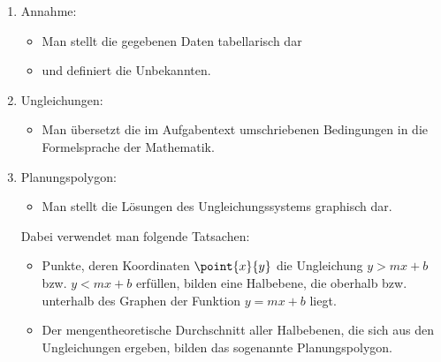 \documentclass[%
11pt,%
twoside,%
titlepage,%
german,%
headsepline%
]{scrartcl}
\begin{document}
\begin{enumerate}
  \item Annahme:
  \begin{itemize}
    \item Man stellt die gegebenen Daten tabellarisch dar
    \item und definiert die Unbekannten.
  \end{itemize}
  \item Ungleichungen:
  \begin{itemize}
    \item Man \"ubersetzt die im Aufgabentext umschriebenen
    Bedingungen in die Formelsprache der Mathematik.
  \end{itemize}
  \item Planungspolygon:
  \begin{itemize}
    \item Man stellt die L\"osungen des Ungleichungssystems graphisch
    dar.
  \end{itemize}
  Dabei verwendet man folgende Tatsachen:
  \begin{itemize}
    \item Punkte, deren Koordinaten $\point{x}{y}$ die Ungleichung $y>mx+b$
    bzw. $y<mx+b$ erf\"ullen, bilden eine Halbebene, die oberhalb bzw.
    unterhalb des Graphen der Funktion $y=mx+b$ liegt.
    \item Der mengentheoretische Durchschnitt aller Halbebenen, die
    sich aus den Ungleichungen ergeben, bilden das sogenannte
    Planungspolygon.
  \end{itemize}
  
  \pagebreak
  

\end{enumerate}
\end{document}
